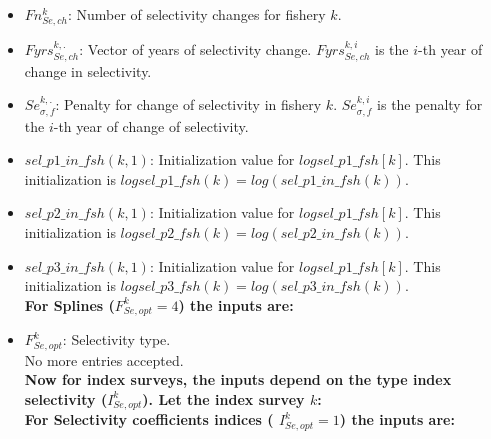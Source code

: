 \documentclass{article}
\begin{document}
\begin{itemize}
    \item $Fn_{Se,ch}^k$: Number of selectivity changes for fishery $k$.
    \item $Fyrs_{Se,ch}^{k, .}$: Vector of years of selectivity change. $Fyrs_{Se,ch}^{k,i}$ is the $i$-th year of change in selectivity.
    \item $Se_{\sigma,f}^{k,.}$: Penalty for change of selectivity in fishery $k$.  $Se_{\sigma,f}^{k,i}$ is the penalty for the $i$-th year of change of selectivity.
    \item $sel\_p1\_in\_fsh(k,1)$: Initialization value for $logsel\_p1\_fsh[k]$. This initialization is $logsel\_p1\_fsh(k) =  log(sel\_p1\_in\_fsh(k))$.
    \item $sel\_p2\_in\_fsh(k,1)$: Initialization value for $logsel\_p1\_fsh[k]$. This initialization is $logsel\_p2\_fsh(k) =  log(sel\_p2\_in\_fsh(k))$.
    \item $sel\_p3\_in\_fsh(k,1)$: Initialization value for $logsel\_p1\_fsh[k]$. This initialization is $logsel\_p3\_fsh(k) =  log(sel\_p3\_in\_fsh(k))$.\\
    
    \textbf{For Splines ($F^k_{Se,opt}=4$) the inputs are:}\\
    
    \item $F^k_{Se,opt}$: Selectivity type.\\
    
    No more entries accepted.\\
    
    \textbf{Now for index surveys, the inputs depend on the type index selectivity ($I_{Se,opt}^k$). Let the index survey  $k$:}\\
    
    \textbf{For Selectivity coefficients indices ( $I_{Se,opt}^k=1$) the inputs are:}\\
    

\end{itemize}
\end{document}
